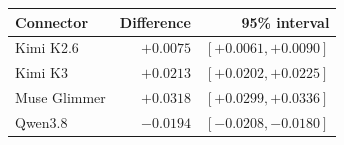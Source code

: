 \begin{tabular}{lrr}
\toprule
Connector & Difference & 95\% interval\\
\midrule
Kimi K2.6 & $+0.0075$ & $[+0.0061, +0.0090]$\\
Kimi K3 & $+0.0213$ & $[+0.0202, +0.0225]$\\
Muse Glimmer & $+0.0318$ & $[+0.0299, +0.0336]$\\
Qwen3.8 & $-0.0194$ & $[-0.0208, -0.0180]$\\
\bottomrule
\end{tabular}
